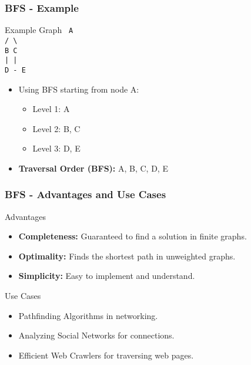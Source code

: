 \documentclass[aspectratio=169]{beamer}
\begin{document}
\begin{frame}[fragile]
    \frametitle{BFS - Example}
    \begin{block}{Example Graph}
        \texttt{
            A \\ 
            / \backslash \\
            B \quad C \\ 
            | \quad | \\ 
            D - E
        }
    \end{block}
    \begin{itemize}
        \item Using BFS starting from node A:
        \begin{itemize}
            \item Level 1: A
            \item Level 2: B, C
            \item Level 3: D, E
        \end{itemize}
        \item \textbf{Traversal Order (BFS):} A, B, C, D, E
    \end{itemize}
\end{frame}

\begin{frame}[fragile]
    \frametitle{BFS - Advantages and Use Cases}
    \begin{block}{Advantages}
        \begin{itemize}
            \item \textbf{Completeness:} Guaranteed to find a solution in finite graphs.
            \item \textbf{Optimality:} Finds the shortest path in unweighted graphs.
            \item \textbf{Simplicity:} Easy to implement and understand.
        \end{itemize}
    \end{block}

    \begin{block}{Use Cases}
        \begin{itemize}
            \item Pathfinding Algorithms in networking.
            \item Analyzing Social Networks for connections.
            \item Efficient Web Crawlers for traversing web pages.
        \end{itemize}
    \end{block}
\end{frame}
\end{document}
